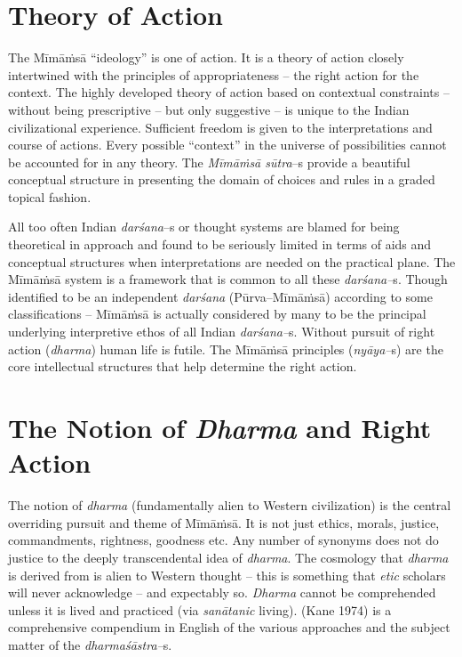 \section*{Theory of Action}

The Mīmāṁsā “ideology” is one of action. It is a theory of action closely intertwined with the principles of appropriateness – the right action for the context. The highly developed theory of action based on contextual constraints – without being prescriptive – but only suggestive – is unique to the Indian civilizational experience. Sufficient freedom is given to the interpretations and course of actions. Every possible “context” in the universe of possibilities cannot be accounted for in any theory. The \textit{Mīmāṁsā sūtra}–s provide a beautiful conceptual structure in presenting the domain of choices and rules in a graded topical fashion.

All too often Indian \textit{darśana}–s or thought systems are blamed for being theoretical in approach and found to be seriously limited in terms of aids and conceptual structures when interpretations are needed on the practical plane. The Mīmāṁsā system is a framework that is common to all these \textit{darśana–}s. Though identified to be an independent \textit{darśana} (Pūrva–Mīmāṁsā) according to some classifications – Mīmāṁsā is actually considered by many to be the principal underlying interpretive ethos of all Indian \textit{darśana–}s. Without pursuit of right action (\textit{dharma}) human life is futile. The Mīmāṁsā principles (\textit{nyāya–}s) are the core intellectual structures that help determine the right action.


\section*{The Notion of \textit{Dharma} and Right Action}

The notion of \textit{dharma} (fundamentally alien to Western civilization) is the central overriding pursuit and theme of Mīmāṁsā. It is not just ethics, morals, justice, commandments, rightness, goodness etc. Any number of synonyms does not do justice to the deeply transcendental idea of \textit{dharma}. The cosmology that \textit{dharma} is derived from is alien to Western thought – this is something that \textit{etic} scholars will never acknowledge – and expectably so. \textit{Dharma} cannot be comprehended unless it is lived and practiced (via \textit{sanātanic} living). (Kane 1974) is a comprehensive compendium in English of the various approaches and the subject matter of the \textit{dharmaśāstra–}s.

